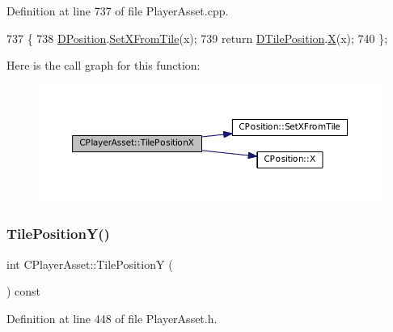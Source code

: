 Definition at line 737 of file Player\+Asset.\+cpp.


\begin{DoxyCode}
737                                     \{
738     \hyperlink{classCPlayerAsset_aa9f53c009b181c7c5647c6b03776a04c}{DPosition}.\hyperlink{classCPosition_ac6a1eeaeb98e20942efea7cf253b2ec4}{SetXFromTile}(x);
739     \textcolor{keywordflow}{return} \hyperlink{classCPlayerAsset_a5b59a9d3b7db8c7fa194b80dafb96186}{DTilePosition}.\hyperlink{classCPosition_a9a6b94d3b91df1492d166d9964c865fc}{X}(x);
740 \};
\end{DoxyCode}
Here is the call graph for this function\+:\nopagebreak
\begin{figure}[H]
\begin{center}
\leavevmode
\includegraphics[width=350pt]{classCPlayerAsset_ad3a0b4bafbfa9021b59925a5c3364cd5_cgraph}
\end{center}
\end{figure}
\hypertarget{classCPlayerAsset_a189adb25bf0a45117a9c0bb36b45e6a4}{}\label{classCPlayerAsset_a189adb25bf0a45117a9c0bb36b45e6a4} 
\subsubsection{\texorpdfstring{Tile\+Position\+Y()}{TilePositionY()}\hspace{0.1cm}{\footnotesize\ttfamily [1/2]}}
{\footnotesize\ttfamily int C\+Player\+Asset\+::\+Tile\+PositionY (\begin{DoxyParamCaption}{ }\end{DoxyParamCaption}) const\hspace{0.3cm}{\ttfamily [inline]}}



Definition at line 448 of file Player\+Asset.\+h.


